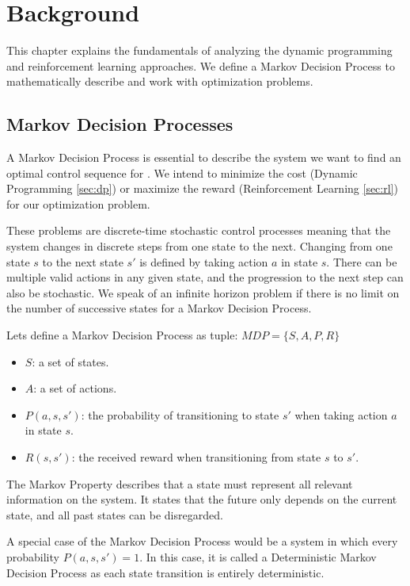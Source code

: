 \chapter{Background}
\label{cha:background}
This chapter explains the fundamentals of analyzing the dynamic programming and reinforcement learning approaches. We define a Markov Decision Process to mathematically describe and work with optimization problems.

\section{Markov Decision Processes}
\label{sec:mdp}
A Markov Decision Process is essential to describe the system we want to find an optimal control sequence for \cite{bellman1957markovian}. We intend to minimize the cost (Dynamic Programming \ref{sec:dp}) or maximize the reward (Reinforcement Learning \ref{sec:rl}) for our optimization problem.

These problems are discrete-time stochastic control processes meaning that the system changes in discrete steps from one state to the next. Changing from one state $s$ to the next state $s'$ is defined by taking action $a$ in state $s$. There can be multiple valid actions in any given state, and the progression to the next step can also be stochastic. We speak of an infinite horizon problem if there is no limit on the number of successive states for a Markov Decision Process.

Lets define a Markov Decision Process as tuple: $MDP = \{S, A, P, R\}$
\begin{itemize}
	\item $S$: a set of states.
	\item $A$: a set of actions.
	\item $P(a, s, s')$: the probability of transitioning to state $s'$ when taking action $a$ in state $s$.
	\item $R(s, s')$: the received reward when transitioning from state $s$ to $s'$.
\end{itemize}
The Markov Property describes that a state must represent all relevant information on the system. It states that the future only depends on the current state, and all past states can be disregarded.

A special case of the Markov Decision Process would be a system in which every probability $P(a, s, s') = 1$. In this case, it is called a Deterministic Markov Decision Process as each state transition is entirely deterministic.

